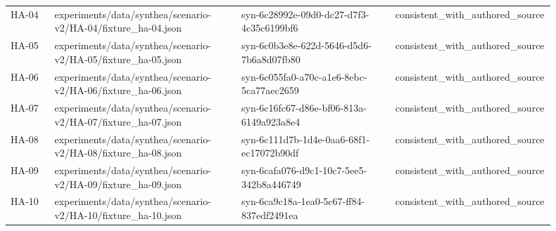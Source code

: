 {\begin{longtable}{p{0.08\linewidth}p{0.34\linewidth}p{0.28\linewidth}p{0.2\linewidth}}
HA-\allowbreak{}04 & experiments/\allowbreak{}data/\allowbreak{}synthea/\allowbreak{}scenario-\allowbreak{}v2/\allowbreak{}HA-\allowbreak{}04/\allowbreak{}fixture\_\allowbreak{}ha-\allowbreak{}04.\allowbreak{}json & syn-\allowbreak{}6c28992e-\allowbreak{}09d0-\allowbreak{}dc27-\allowbreak{}d7f3-\allowbreak{}4c35c6199bf6 & consistent\_\allowbreak{}with\_\allowbreak{}authored\_\allowbreak{}source \\
HA-\allowbreak{}05 & experiments/\allowbreak{}data/\allowbreak{}synthea/\allowbreak{}scenario-\allowbreak{}v2/\allowbreak{}HA-\allowbreak{}05/\allowbreak{}fixture\_\allowbreak{}ha-\allowbreak{}05.\allowbreak{}json & syn-\allowbreak{}6c0b3e8e-\allowbreak{}622d-\allowbreak{}5646-\allowbreak{}d5d6-\allowbreak{}7b6a8d07fb80 & consistent\_\allowbreak{}with\_\allowbreak{}authored\_\allowbreak{}source \\
HA-\allowbreak{}06 & experiments/\allowbreak{}data/\allowbreak{}synthea/\allowbreak{}scenario-\allowbreak{}v2/\allowbreak{}HA-\allowbreak{}06/\allowbreak{}fixture\_\allowbreak{}ha-\allowbreak{}06.\allowbreak{}json & syn-\allowbreak{}6c055fa0-\allowbreak{}a70c-\allowbreak{}a1e6-\allowbreak{}8ebc-\allowbreak{}5ca77aec2659 & consistent\_\allowbreak{}with\_\allowbreak{}authored\_\allowbreak{}source \\
HA-\allowbreak{}07 & experiments/\allowbreak{}data/\allowbreak{}synthea/\allowbreak{}scenario-\allowbreak{}v2/\allowbreak{}HA-\allowbreak{}07/\allowbreak{}fixture\_\allowbreak{}ha-\allowbreak{}07.\allowbreak{}json & syn-\allowbreak{}6c16fc67-\allowbreak{}d86e-\allowbreak{}bf06-\allowbreak{}813a-\allowbreak{}6149a923a8e4 & consistent\_\allowbreak{}with\_\allowbreak{}authored\_\allowbreak{}source \\
HA-\allowbreak{}08 & experiments/\allowbreak{}data/\allowbreak{}synthea/\allowbreak{}scenario-\allowbreak{}v2/\allowbreak{}HA-\allowbreak{}08/\allowbreak{}fixture\_\allowbreak{}ha-\allowbreak{}08.\allowbreak{}json & syn-\allowbreak{}6c111d7b-\allowbreak{}1d4e-\allowbreak{}0aa6-\allowbreak{}68f1-\allowbreak{}ec17072b90df & consistent\_\allowbreak{}with\_\allowbreak{}authored\_\allowbreak{}source \\
HA-\allowbreak{}09 & experiments/\allowbreak{}data/\allowbreak{}synthea/\allowbreak{}scenario-\allowbreak{}v2/\allowbreak{}HA-\allowbreak{}09/\allowbreak{}fixture\_\allowbreak{}ha-\allowbreak{}09.\allowbreak{}json & syn-\allowbreak{}6cafa076-\allowbreak{}d9c1-\allowbreak{}10c7-\allowbreak{}5ee5-\allowbreak{}342b8a446749 & consistent\_\allowbreak{}with\_\allowbreak{}authored\_\allowbreak{}source \\
HA-\allowbreak{}10 & experiments/\allowbreak{}data/\allowbreak{}synthea/\allowbreak{}scenario-\allowbreak{}v2/\allowbreak{}HA-\allowbreak{}10/\allowbreak{}fixture\_\allowbreak{}ha-\allowbreak{}10.\allowbreak{}json & syn-\allowbreak{}6ca9c18a-\allowbreak{}1ea0-\allowbreak{}5c67-\allowbreak{}ff84-\allowbreak{}837edf2491ea & consistent\_\allowbreak{}with\_\allowbreak{}authored\_\allowbreak{}source \\
\hline\end{longtable}}
